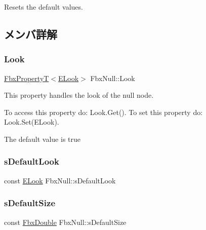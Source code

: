 Resets the default values. 



\subsection{メンバ詳解}
\mbox{\label{class_fbx_null_a19a7ff9c2111b18702002f4728013278}} 
\subsubsection{\texorpdfstring{Look}{Look}}
{\footnotesize\ttfamily \hyperlink{class_fbx_property_t}{Fbx\+PropertyT}$<$\hyperlink{class_fbx_null_aa68cd0be1fca86a79ab603ee99505d78}{E\+Look}$>$ Fbx\+Null\+::\+Look}

This property handles the look of the null node.

To access this property do\+: Look.\+Get(). To set this property do\+: Look.\+Set(\+E\+Look).

The default value is true \mbox{\label{class_fbx_null_a0945b3b81e8672f19f19445f593d6cca}} 
\subsubsection{\texorpdfstring{s\+Default\+Look}{sDefaultLook}}
{\footnotesize\ttfamily const \hyperlink{class_fbx_null_aa68cd0be1fca86a79ab603ee99505d78}{E\+Look} Fbx\+Null\+::s\+Default\+Look\hspace{0.3cm}{\ttfamily [static]}}

\mbox{\label{class_fbx_null_a87d33c8990012bca2e52101ea02af9d5}} 
\subsubsection{\texorpdfstring{s\+Default\+Size}{sDefaultSize}}
{\footnotesize\ttfamily const \hyperlink{fbxtypes_8h_a171e72a1c46fc15c1a6c9c31948c1c5b}{Fbx\+Double} Fbx\+Null\+::s\+Default\+Size\hspace{0.3cm}{\ttfamily [static]}}

